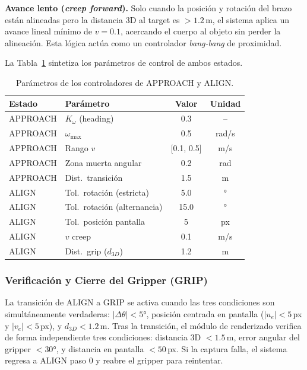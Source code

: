 \documentclass[10pt,twocolumn,letterpaper]{article}
\begin{document}
\textbf{Avance lento (\textit{creep forward}).} Solo cuando la posición y rotación del brazo están alineadas pero la distancia 3D al target es $> 1.2$\,m, el sistema aplica un avance lineal mínimo de $v = 0.1$, acercando el cuerpo al objeto sin perder la alineación. Esta lógica actúa como un controlador \textit{bang-bang} de proximidad.

La Tabla~\ref{tab:control_params} sintetiza los parámetros de control de ambos estados.

\begin{table}[H]
\centering
\caption{Parámetros de los controladores de APPROACH y ALIGN.}
\label{tab:control_params}
\scriptsize
\begin{tabular}{@{}llcc@{}}
\toprule
\textbf{Estado} & \textbf{Parámetro} & \textbf{Valor} & \textbf{Unidad} \\
\midrule
APPROACH & $K_\omega$ (heading) & 0.3 & -- \\
APPROACH & $\omega_{\max}$ & 0.5 & rad/s \\
APPROACH & Rango $v$ & [0.1, 0.5] & m/s \\
APPROACH & Zona muerta angular & 0.2 & rad \\
APPROACH & Dist.\ transición & 1.5 & m \\
\midrule
ALIGN & Tol.\ rotación (estricta) & 5.0 & $°$ \\
ALIGN & Tol.\ rotación (alternancia) & 15.0 & $°$ \\
ALIGN & Tol.\ posición pantalla & 5 & px \\
ALIGN & $v$ creep & 0.1 & m/s \\
ALIGN & Dist.\ grip ($d_{3D}$) & 1.2 & m \\
\bottomrule
\end{tabular}
\end{table}

\subsubsection{Verificación y Cierre del Gripper (GRIP)}

La transición de ALIGN a GRIP se activa cuando las tres condiciones son simultáneamente verdaderas: $|\Delta\theta| < 5°$, posición centrada en pantalla ($|u_e| < 5$\,px y $|v_e| < 5$\,px), y $d_{3D} < 1.2$\,m. Tras la transición, el módulo de renderizado verifica de forma independiente tres condiciones: distancia 3D $< 1.5$\,m, error angular del gripper $< 30°$, y distancia en pantalla $< 50$\,px. Si la captura falla, el sistema regresa a ALIGN paso 0 y reabre el gripper para reintentar.
\end{document}
